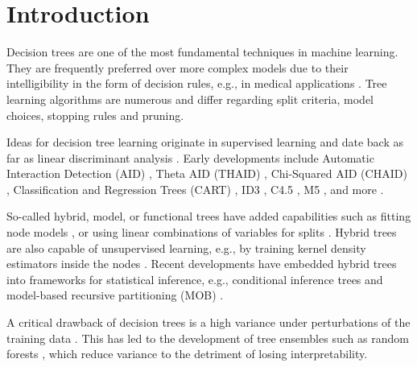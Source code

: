 \documentclass[a4paper, 11pt]{article}
\begin{document}
\section{Introduction}

Decision trees are one of the most fundamental techniques in machine learning. They are frequently preferred over more complex models due to their intelligibility in the form of decision rules, e.g., in medical applications \cite{podgorelec_trees_medicine}. Tree learning algorithms are numerous and differ regarding split criteria, model choices, stopping rules and pruning. \par
Ideas for decision tree learning originate in supervised learning and date back as far as linear discriminant analysis \cite{fisher_lda}. Early developments include Automatic Interaction Detection (AID) \cite{hawkins_AID}, Theta AID (THAID) \cite{ messenger_mandell_thaid}, Chi-Squared AID (CHAID) \cite{kass_chaid}, Classification and Regression Trees (CART) \cite{cart_1, hastie_elemstatlearn}, ID3 \cite{quinlan_induction}, C4.5 \cite{quinlan_c45}, M5 \cite{quinlan_m5}, and more \cite{loh_trees_review}.
\par
So-called hybrid, model, or functional trees \cite{zeileis_mob} have added capabilities such as fitting node models \cite{quinlan_model_tree}, or using linear combinations of variables for splits \cite{brodley_multivariate_trees}. Hybrid trees are also capable of unsupervised learning, e.g., by training kernel density estimators inside the nodes \cite{ram_density_estimation_tree}.
Recent developments have embedded hybrid trees into frameworks for  statistical inference, e.g., conditional inference trees \cite{hothorn_ctree} and model-based recursive partitioning (MOB) \cite{zeileis_mob}.
\par
A critical drawback of decision trees is a high variance under perturbations of the training data \cite{hastie_elemstatlearn}. This has led to the development of tree ensembles such as random forests \cite{breiman_randomforests}, which reduce variance to the detriment of losing interpretability.

\par
\end{document}
